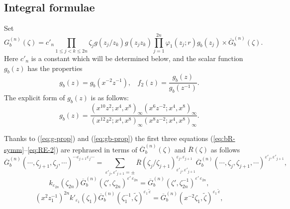 \documentclass[a4paper,10pt]{article}
\begin{document}
{\subsection{Integral formulae} 

Set 
\begin{equation}
 G_{b}^{(n)}(\zeta)
=c'_n \prod_{1\leqslant j< k \leqslant 2n} \zeta_j g(z_j/z_k)
g(z_j z_k) \prod_{j=1}^{2n} \varphi_1 (z_j ;r) g_b (z_j )
\times \overline{G}_{b}^{(n)}(\zeta). 
\label{eq:bG-bar}
\end{equation}
Here $c'_n$ is a constant which will be determined below, 
and the scalar function $g_b (z)$ has the properties 
\begin{equation}
g_b (z)=g_b (x^{-2}z^{-1}), ~~~~ 
f_2 (z)=\frac{g_b (z)}{g_b (z^{-1})}. 
\label{eq:gb-prop}
\end{equation}
The explicit form of $g_b (z)$ is as follows: 
\begin{equation}
g_b (z)=\frac{
(x^{10}z^2;x^4,x^8)_{\infty}(x^6 z^{-2};x^4,x^8)_{\infty}}
{(x^{12}z^2;x^4,x^8)_{\infty}(x^8 z^{-2};x^4,x^8)_{\infty}}. 
\label{eq:df-gb}
\end{equation}

Thanks to (\ref{eq:g-prop}) and (\ref{eq:gb-prop}) the 
first three equations (\ref{eq:bR-symm}--\ref{eq:RE-2}) are 
rephrased in terms of 
$\overline{G}_{b}^{(n)}(\zeta)$ 
and $\overline{R}(\zeta)$ as follows 
\begin{equation}
\overline{G}_{b}^{(n)} 
(\cdots,\zeta_{j+1},\zeta_j,\cdots)^{\cdots 
\varepsilon_{j+1}\varepsilon_j\cdots}
=\sum_{\varepsilon'_j , \varepsilon'_{j+1}=\pm} 
\overline{R}(\zeta_j/\zeta_{j+1})^{
\varepsilon_j , \varepsilon_{j+1}}_{
\varepsilon'_j , \varepsilon'_{j+1}}
\overline{G}_{b}^{(n)} 
(\cdots,\zeta_j,\zeta_{j+1},\cdots)^{
\varepsilon'_j , \varepsilon'_{j+1}}, 
\label{eq:bR-symm'} 
\end{equation}
\begin{equation}
k_{\varepsilon_{2n}}(\zeta_{2n})
\overline{G}_{b}^{(n)} (\zeta', \zeta_{2n})^{
\varepsilon'\,\varepsilon_{2n}}
=\overline{G}_{b}^{(n)} 
(\zeta',\zeta_{2n}^{-1})^{\varepsilon'\,\varepsilon_{2n}}, 
\label{eq:RE1'}
\end{equation}
\begin{equation}
(x^2 z_1^{-1})^{2n}k'_{\varepsilon_{1}}(\zeta_{1})
\overline{G}_{b}^{(n)} (\zeta_{1}^{-1},\tilde{\zeta})^{
\varepsilon_1\,\tilde{\varepsilon}}
=\overline{G}_{b}^{(n)} 
(x^{-2}\zeta_{1},\tilde{\zeta})^{
\varepsilon_1\,\tilde{\varepsilon}}, 
\label{eq:RE2'}
\end{equation}

}
\end{document}
